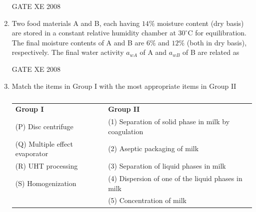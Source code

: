 \documentclass[12pt]{article}
\begin{document}
\begin{enumerate}
GATE XE 2008  

\item Two food materials A and B, each having $14\%$ moisture content (dry basis) are stored in a constant relative humidity chamber at $30^{\circ} \mathrm{C}$ for equilibration. The final moisture contents of A and B are $6\%$ and $12\%$ (both in dry basis), respectively. The final water activity $a_{wA}$ of A and $a_{wB}$ of B are related as  

\begin{enumerate}
\end{enumerate}

GATE XE 2008  

\item Match the items in Group I with the most appropriate items in Group II  

\begin{table}[H]     \centering     \caption{}     \label{}     \begin{tabular}{p{7cm} p{7cm}}
\textbf{Group I} & \textbf{Group II} \\
(P) Disc centrifuge & (1) Separation of solid phase in milk by coagulation \\
(Q) Multiple effect evaporator & (2) Aseptic packaging of milk \\
(R) UHT processing & (3) Separation of liquid phases in milk \\
(S) Homogenization & (4) Dispersion of one of the liquid phases in milk \\
& (5) Concentration of milk \\
\end{tabular} \end{table}  

\begin{enumerate}
\end{enumerate}


\end{enumerate}
\end{document}
